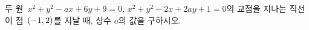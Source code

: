 두 원~$x^2+y^2-ax+6y+9=0$, $x^2+y^2-2x+2ay+1=0$의 교점을 지나는 직선이 점~$(-1{,}\mkern3mu\mathopen{}2)$를 지날 때, 상수 $a$의 값을 구하시오.
